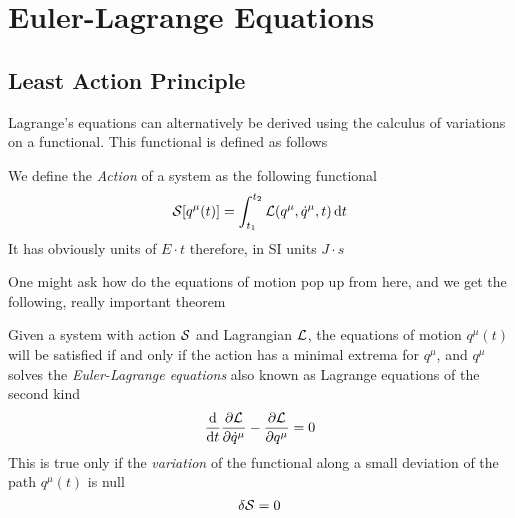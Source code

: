 \documentclass[../admech.tex]{subfiles}
\begin{document}
\section{Euler-Lagrange Equations}
\subsection{Least Action Principle}
Lagrange's equations can alternatively be derived using the calculus of variations on a functional. This functional is defined as follows
\begin{dfn}
	We define the \emph{Action} of a system as the following functional
	\begin{equation}
		\mathcal{S}[q^\mu(t)]=\int_{t_1}^{t_2}\mathcal{L}(q^\mu,\dot{q}^\mu,t)\dd{t}
		\label{eq:action}
	\end{equation}
	It has obviously units of $E\cdot t$ therefore, in SI units $J\cdot s$
\end{dfn}
One might ask how do the equations of motion pop up from here, and we get the following, really important theorem
\begin{thm}
	Given a system with action $\mathcal{S}$ and Lagrangian $\mathcal{L}$, the equations of motion $q^\mu(t)$ will be satisfied if and only if the action has a minimal extrema for $q^\mu$, and $q^\mu$ solves the \emph{Euler-Lagrange equations} also known as Lagrange equations of the second kind
	\begin{equation}
		\dv{t}\pdv{\mathcal{L}}{\dot{q}^\mu}-\pdv{\mathcal{L}}{q^\mu}=0
		\label{eq:eleq}
	\end{equation}
	This is true only if the \emph{variation} of the functional along a small deviation of the path $q^\mu(t)$ is null
	\begin{equation}
		\delta\mathcal{S}=0
		\label{eq:variationaction}
	\end{equation}
\end{thm}
\end{document}
